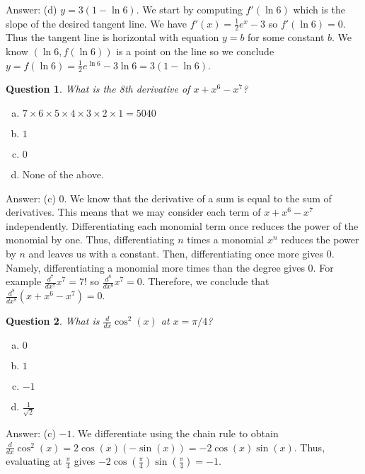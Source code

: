 \documentclass[10pt]{article}
\newtheorem{quiz}{Question}
\begin{document}
\begin{multicols}{2}
Answer: (d) $y = 3(1 - \ln6)$. We start by computing $f'(\ln6)$ which is the slope of the desired tangent line. We have $f'(x) = \frac{1}{2}e^x - 3$ so $f'(\ln6) = 0$. Thus the tangent line is horizontal with equation $y = b$ for some constant $b$. We know $(\ln6, f(\ln6))$ is a point on the line so we conclude $y = f(\ln6) = \frac{1}{2}e^{\ln6} - 3\ln6 = 3(1 - \ln6)$.

\vspace{5mm}

\begin{quiz} What is the 8th derivative of $x+x^6-x^7$?
\end{quiz}
\begin {enumerate}[(a)]
\item $7 \times 6 \times 5 \times 4 \times 3 \times 2 \times 1= 5040$
\item $1$
\item $0$
\item None of the above.
\end{enumerate}
\vspace{0.5 cm}

Answer: (c) 0. We know that the derivative of a sum is equal to the sum of derivatives. This means that we may consider each term of $x + x^6 - x^7$ independently. Differentiating each monomial term once reduces the power of the monomial by one. Thus, differentiating $n$ times a monomial $x^n$ reduces the power by $n$ and leaves us with a constant. Then, differentiating once more gives 0. Namely, differentiating a monomial more times than the degree gives 0. For example $\frac{d^7}{dx^7}x^7 = 7!$ so $\frac{d^8}{dx^8}x^7 = 0$. Therefore, we conclude that $\frac{d^8}{dx^8}(x + x^6 - x^7) = 0$.  

\vspace{5mm}

\begin{quiz} What is $\frac{d}{dx} \cos^2(x)$ at $x=\pi/4$?
\end{quiz}
\begin {enumerate}[(a)]
\item $0$
\item $1$
\item $-1$
\item $\frac{1}{\sqrt{2}}$
\end{enumerate}

\vspace{0.5 cm}

Answer: (c) $-1$. We differentiate using the chain rule to obtain $\frac{d}{dx}\cos^2(x) = 2\cos(x)(-\sin(x)) = -2\cos(x)\sin(x)$. Thus, evaluating at $\frac{\pi}{4}$ gives $-2\cos(\frac{\pi}{4})\sin(\frac{\pi}{4}) = -1$.


\end{multicols}
\end{document}
